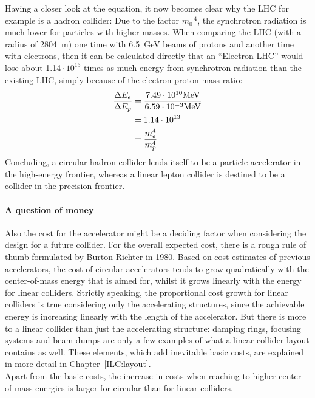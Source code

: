 Having a closer look at the equation, it now becomes clear why the LHC for example is a hadron collider:
Due to the factor $m_0^{-4}$, the synchrotron radiation is much lower for particles with higher masses.
When comparing the LHC (with a radius of \SI{2804}{\meter}) one time with \SI{6.5}{\GeV} beams of protons and another time with electrons, then it can be calculated directly that an ``Electron-LHC'' would lose about 1.14\,$\cdot\,10^{13}$ times as much energy from synchrotron radiation than the existing LHC, simply because of the electron-proton mass ratio:
\begin{align*}
 \frac{\Delta E_e}{\Delta E_p} &= \frac{7.49\cdot10^{10} \textnormal{MeV}}{6.59\cdot10^{-3} \textnormal{MeV}}\\
 &=1.14\cdot10^{13}\\
 &=\frac{m_e^4}{m_p^4}
\end{align*}
Concluding, a circular hadron collider lends itself to be a particle accelerator in the high-energy frontier, whereas a linear lepton collider is destined to be a collider in the precision frontier.

\paragraph{A question of money}
Also the cost for the accelerator might be a deciding factor when considering the design for a future collider.
For the overall expected cost, there is a rough rule of thumb formulated by Burton Richter in 1980. 
Based on cost estimates of previous accelerators, the cost of circular accelerators tends to grow quadratically with the center-of-mass energy that is aimed for, whilst it grows linearly with the energy for linear colliders.
Strictly speaking, the proportional cost growth for linear colliders is true considering only the accelerating structures, since the achievable energy is increasing linearly with the length of the accelerator.
But there is more to a linear collider than just the accelerating structure: damping rings, focusing systems and beam dumps are only a few examples of what a linear collider layout contains as well.
These elements, which add inevitable basic costs, are explained in more detail in Chapter~\ref{ILC:layout}.\\
Apart from the basic costs, the increase in costs when reaching to higher center-of-mass energies is larger for circular than for linear colliders.